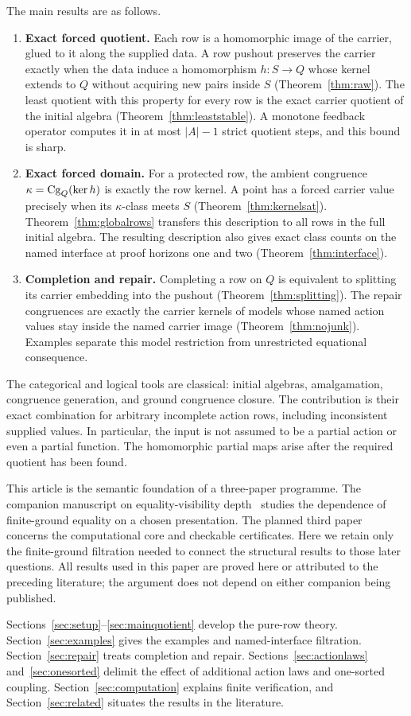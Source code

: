 The main results are as follows.
\begin{enumerate}
\item \textbf{Exact forced quotient.} Each row is a homomorphic image of the
carrier, glued to it along the supplied data. A row pushout preserves the
carrier exactly when the data induce a homomorphism $h:S\to Q$ whose kernel
extends to $Q$ without acquiring new pairs inside $S$
(Theorem~\ref{thm:raw}). The least quotient with this property for every row
is the exact carrier quotient of the initial algebra
(Theorem~\ref{thm:leaststable}). A monotone feedback operator computes it in
at most $|A|-1$ strict quotient steps, and this bound is sharp.
\item \textbf{Exact forced domain.} For a protected row, the ambient
congruence $\kappa=\operatorname{Cg}_Q(\ker h)$ is exactly the row kernel. A point has a
forced carrier value precisely when its $\kappa$-class meets $S$
(Theorem~\ref{thm:kernelsat}). Theorem~\ref{thm:globalrows} transfers this
description to all rows in the full initial algebra. The resulting
description also gives exact class counts on the named interface at proof
horizons one and two (Theorem~\ref{thm:interface}).
\item \textbf{Completion and repair.} Completing a row on $Q$ is equivalent
to splitting its carrier embedding into the pushout
(Theorem~\ref{thm:splitting}). The repair congruences are exactly the carrier
kernels of models whose named action values stay inside the named carrier
image (Theorem~\ref{thm:nojunk}). Examples separate this model restriction
from unrestricted equational consequence.
\end{enumerate}

The categorical and logical tools are classical: initial algebras,
amalgamation, congruence generation, and ground congruence closure. The
contribution is their exact combination for arbitrary incomplete action
rows, including inconsistent supplied values. In particular, the input is
not assumed to be a partial action or even a partial function. The
homomorphic partial maps arise after the required quotient has been found.

This article is the semantic foundation of a three-paper programme. The
companion manuscript on equality-visibility depth~\cite{ShcherbakovII}
studies the dependence of finite-ground equality on a chosen presentation.
The planned third paper concerns the computational core and checkable
certificates. Here we retain only the finite-ground filtration needed to
connect the structural results to those later questions. All results used
in this paper are proved here or attributed to the preceding literature;
the argument does not depend on either companion being published.

Sections~\ref{sec:setup}--\ref{sec:mainquotient} develop the pure-row theory.
Section~\ref{sec:examples} gives the examples and named-interface filtration.
Section~\ref{sec:repair} treats completion and repair.
Sections~\ref{sec:actionlaws} and~\ref{sec:onesorted} delimit the effect of
additional action laws and one-sorted coupling.
Section~\ref{sec:computation} explains finite verification, and
Section~\ref{sec:related} situates the results in the literature.
